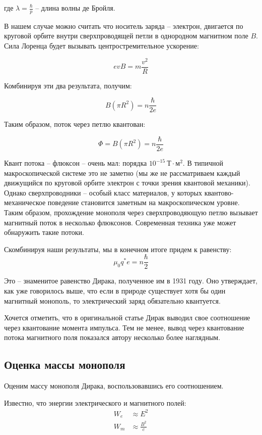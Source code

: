 \documentclass[a4paper, 12pt]{article}
\begin{document}
где $\lambda = \frac{\hbar}{p}$ -- длина волны де Бройля. 

В нашем случае можно считать что носитель заряда -- электрон, двигается по круговой орбите внутри сверхпроводящей петли в однородном магнитном поле $B$. Сила Лоренца будет вызывать центростремительное ускорение:

\[
    evB = m\frac{v^2}{R}  
\]

Комбинируя эти два результата, получим:

\[
    B(\pi R^2) = n \frac{\hbar}{2e}
\]

Таким образом, поток через петлю квантован:

\[
    \Phi = B(\pi R^2) = n \frac{\hbar}{2e}
\]

Квант потока -- флюксон -- очень мал: порядка $10^{-15}~Т\cdot м^2$. В типичной макроскопической системе это не заметно (мы же не рассматриваем каждый движущийся по круговой орбите электрон с точки зрения квантовой механики). Однако сверхпроводники -- особый класс материалов, у которых квантово-механическое поведение становится заметным на макроскопическом уровне. Таким образом, прохождение монополя через сверхпроводяющую петлю вызывает магнитный поток в несколько флюксонов. Современная техника уже может обнаружить такие потоки.

Скомбинируя наши результаты, мы в конечном итоге придем к равенству:
\[
    \mu_0 q^* e = n \frac{\hbar}{2}
\]

Это -- знаменитое равенство Дирака, полученное им в 1931 году. Оно утверждает, как уже говорилось выше, что если в природе существует хотя бы один магнитный монополь, то электрический заряд обязательно квантуется.

Хочется отметить, что в оригинальной статье Дирак выводил свое соотношение через квантование момента импульса. Тем не менее, вывод через квантование потока магнитного поля показался автору несколько более наглядным.

\subsection{Оценка массы монополя}
Оценим массу монополя Дирака, воспользовавшись его соотношением. 

Известно, что энергии электрического и магнитного полей:
\begin{align*}
    W_e &\approx E^2 \\
    W_m &\approx \frac{B^2}{c}
\end{align*}
\end{document}
